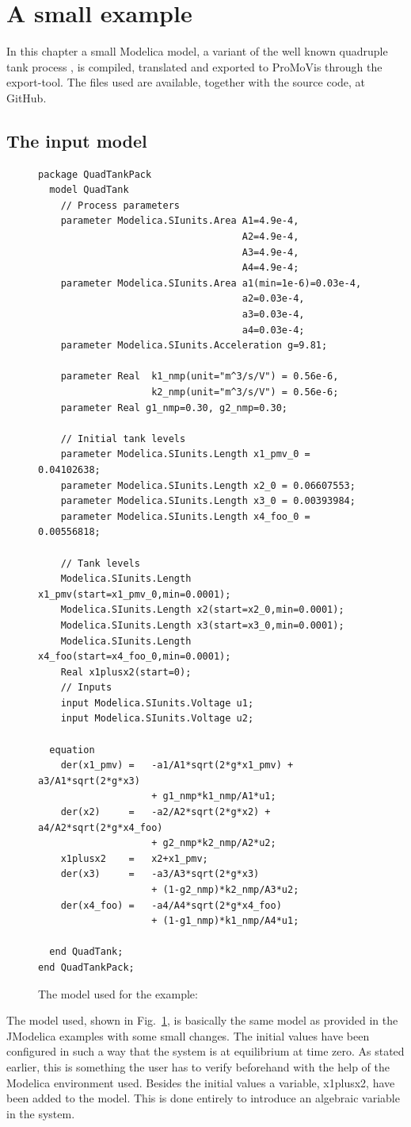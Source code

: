 \section{A small example}
In this chapter a small Modelica model, a variant of the well known quadruple tank process \cite{QuadTankRef}\nocite{*}, is compiled, translated and exported to ProMoVis through the export-tool. The files used are available, together with the source code, at GitHub\cite{githabb}\nocite{*}. 
\subsection{The input model}
\begin{figure}
\lstset{language=modelica}
\begin{lstlisting}
package QuadTankPack
  model QuadTank
    // Process parameters
	parameter Modelica.SIunits.Area A1=4.9e-4, 
									A2=4.9e-4, 
									A3=4.9e-4, 
									A4=4.9e-4;
	parameter Modelica.SIunits.Area a1(min=1e-6)=0.03e-4, 
									a2=0.03e-4, 
									a3=0.03e-4, 
									a4=0.03e-4;
	parameter Modelica.SIunits.Acceleration g=9.81;
	
	parameter Real 	k1_nmp(unit="m^3/s/V") = 0.56e-6, 
					k2_nmp(unit="m^3/s/V") = 0.56e-6;
	parameter Real g1_nmp=0.30, g2_nmp=0.30;

    // Initial tank levels
	parameter Modelica.SIunits.Length x1_pmv_0 = 0.04102638;
	parameter Modelica.SIunits.Length x2_0 = 0.06607553;
	parameter Modelica.SIunits.Length x3_0 = 0.00393984;
	parameter Modelica.SIunits.Length x4_foo_0 = 0.00556818;
	
    // Tank levels
	Modelica.SIunits.Length x1_pmv(start=x1_pmv_0,min=0.0001);
	Modelica.SIunits.Length x2(start=x2_0,min=0.0001);
	Modelica.SIunits.Length x3(start=x3_0,min=0.0001);
	Modelica.SIunits.Length x4_foo(start=x4_foo_0,min=0.0001);
	Real x1plusx2(start=0);
	// Inputs
	input Modelica.SIunits.Voltage u1;
	input Modelica.SIunits.Voltage u2;

  equation    
    der(x1_pmv) = 	-a1/A1*sqrt(2*g*x1_pmv) + a3/A1*sqrt(2*g*x3) 
					+ g1_nmp*k1_nmp/A1*u1;						
	der(x2) 	= 	-a2/A2*sqrt(2*g*x2) + a4/A2*sqrt(2*g*x4_foo)
					+ g2_nmp*k2_nmp/A2*u2;
	x1plusx2	=	x2+x1_pmv;
	der(x3) 	= 	-a3/A3*sqrt(2*g*x3) 
					+ (1-g2_nmp)*k2_nmp/A3*u2;
	der(x4_foo) = 	-a4/A4*sqrt(2*g*x4_foo) 
					+ (1-g1_nmp)*k1_nmp/A4*u1;

  end QuadTank;
end QuadTankPack;
\end{lstlisting}
\caption{The model used for the example:}
\label{fig:exfile}
\end{figure} 
The model used, shown in Fig.~\ref{fig:exfile}, is basically the same model as provided in the JModelica examples with some small changes. The initial values have been configured in such a way that the system is at equilibrium at time zero. As stated earlier, this is something the user has to verify beforehand with the help of the Modelica environment used. Besides the initial values a variable, x1plusx2, have been added to the model. This is done entirely to introduce an algebraic variable in the system.
